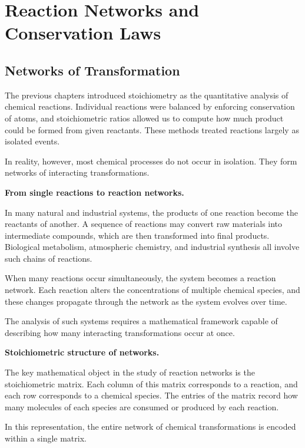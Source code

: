 \documentclass[11pt, openany]{book}
\theoremstyle{plain}
\theoremstyle{definition}
\theoremstyle{remark}
\begin{document}
\chapter{Reaction Networks and Conservation Laws}

\section*{Networks of Transformation}

The previous chapters introduced stoichiometry as the quantitative
analysis of chemical reactions. Individual reactions were balanced by
enforcing conservation of atoms, and stoichiometric ratios allowed us to
compute how much product could be formed from given reactants. These
methods treated reactions largely as isolated events.

In reality, however, most chemical processes do not occur in isolation.
They form networks of interacting transformations.

\medskip

\textbf{From single reactions to reaction networks.}

In many natural and industrial systems, the products of one reaction
become the reactants of another. A sequence of reactions may convert raw
materials into intermediate compounds, which are then transformed into
final products. Biological metabolism, atmospheric chemistry, and
industrial synthesis all involve such chains of reactions.

When many reactions occur simultaneously, the system becomes a reaction
network. Each reaction alters the concentrations of multiple chemical
species, and these changes propagate through the network as the system
evolves over time.

The analysis of such systems requires a mathematical framework capable
of describing how many interacting transformations occur at once.

\medskip

\textbf{Stoichiometric structure of networks.}

The key mathematical object in the study of reaction networks is the
stoichiometric matrix. Each column of this matrix corresponds to a
reaction, and each row corresponds to a chemical species. The entries of
the matrix record how many molecules of each species are consumed or
produced by each reaction.

In this representation, the entire network of chemical transformations
is encoded within a single matrix.
\end{document}
